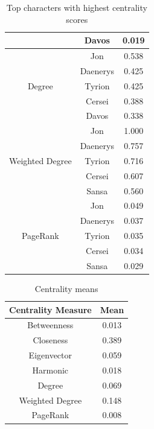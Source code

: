 \documentclass[10pt,twocolumn,letterpaper]{article}
\begin{document}
\begin{table}[!h]
\begin{tabular}{c|c|c}
                    & Davos & 0.019 \\
        \hline
                    & Jon & 0.538 \\
                    & Daenerys & 0.425 \\
        Degree      & Tyrion & 0.425 \\
                    & Cersei & 0.388 \\
                    & Davos & 0.338 \\
        \hline
                    & Jon & 1.000 \\
                    & Daenerys & 0.757 \\
        Weighted Degree & Tyrion & 0.716 \\
                    & Cersei & 0.607 \\
                    & Sansa & 0.560 \\
        \hline
                    & Jon & 0.049 \\
                    & Daenerys & 0.037 \\
        PageRank    & Tyrion & 0.035 \\
                    & Cersei & 0.034 \\
                    & Sansa & 0.029 \\
        \hline
    \end{tabular}
    \vspace{0.2cm}
    \caption{Top characters with highest centrality scores}
    \label{tab:my_label}
\end{table}


\begin{table}[!h]
    \centering
    \begin{tabular}{c|c}
        Centrality Measure & Mean  \\
        \hline
        Betweenness & 0.013 \\
        Closeness & 0.389 \\
        Eigenvector & 0.059 \\
        Harmonic & 0.018 \\
        Degree & 0.069 \\
        Weighted Degree & 0.148 \\
        PageRank & 0.008 \\
        \hline 
    \end{tabular} \\
    \caption{Centrality means}
    \label{tab:my_label}
\end{table}
\end{document}
